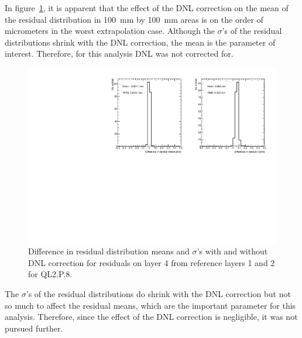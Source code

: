 In figure~\ref{fig:dnl_compare_fits}, it is apparent that the effect of the DNL correction on the mean of the residual distribution in \SI{100}{\milli\meter} by \SI{100}{\milli\meter} areas is on the order of micrometers in the worst extrapolation case. Although the $\sigma$'s of the residual distributions shrink with the DNL correction, the mean is the parameter of interest. Therefore, for this analysis DNL was not corrected for.

\begin{figure}
    \centering
    \includegraphics[width = \textwidth]{figures/figure_compare_residual_fits_QL2P08_3100V_2021-06-18_no_dnl_minus_QL2P08_3100V_2021-06-18_2_50um_universal_DNL_layer4_fixedlayers12.pdf}
    \caption{Difference in residual distribution means and $\sigma$'s with and without DNL correction for residuals on layer 4 from reference layers 1 and 2 for QL2.P.8.}
    \label{fig:dnl_compare_fits}
\end{figure}

The $\sigma$'s of the residual distributions do shrink with the DNL correction but not so much to affect the residual means, which are the important parameter for this analysis. Therefore, since the effect of the DNL correction is negligible, it was not pursued further.






























